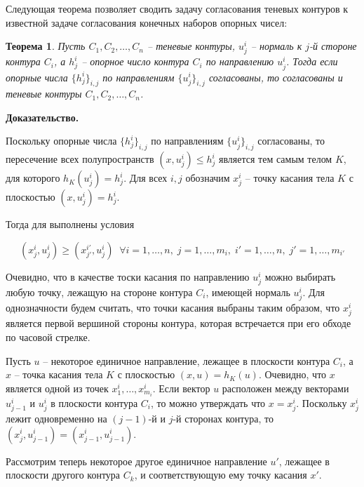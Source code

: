 \documentclass[a4paper, 10pt]{article}
\theoremstyle{definition}
\theoremstyle{plain}
\newtheorem{SmartTheorem}{Теорема}
\theoremstyle{plain}
\begin{document}
Следующая теорема позволяет сводить задачу согласования теневых контуров к
известной задаче согласования конечных наборов опорных чисел:

\begin{SmartTheorem}
 Пусть $C_{1}, C_{2}, \ldots, C_{n}$ -- теневые контуры,
 $u^{i}_{j}$ -- нормаль к $j$-й стороне контура $C_{i}$, а $h^{i}_{j}$ --
 опорное число контура $C_{i}$ по направлению $u^{i}_{j}$.
 Тогда если опорные числа $\{h^{i}_{j}\}_{i, j}$ по направлениям
 $\{u^{i}_{j}\}_{i, j}$ согласованы, то согласованы и теневые контуры
 $C_{1}, C_{2}, \ldots, C_{n}$.
\end{SmartTheorem}

\textbf{Доказательство.}

Поскольку опорные числа $\{h^{i}_{j}\}_{i, j}$ по направлениям
$\{u^{i}_{j}\}_{i, j}$ согласованы, то пересечение
всех полупространств $(x, u^{i}_{j}) \leq h^{i}_{j}$ является тем самым телом
$K$, для которого $h_{K}(u^{i}_{j}) = h^{i}_{j}$.
Для всех $i, j$ обозначим $x^{i}_{j}$ -- точку касания тела $K$ с плоскостью
$(x, u^{i}_{j}) = h^{i}_{j}$.

Тогда для выполнены условия

\begin{equation*}
 (x^{i}_{j}, u^{i}_{j}) \geq (x^{i'}_{j'}, u^{i}_{j}) \;\;
 \forall i = 1, \ldots, n, \;
 j = 1, \ldots, m_{i}, \;
 i' = 1, \ldots, n, \;
 j' = 1, \ldots, m_{i'}
\end{equation*}

Очевидно, что в качестве тоски касания по направлению $u^{i}_{j}$ можно
выбирать любую точку, лежащую на стороне контура $C_{i}$, имеющей нормаль
$u^{i}_{j}$. Для однозначности будем считать, что точки касания выбраны таким
образом, что $x^{i}_{j}$ является первой вершиной стороны контура, которая
встречается при его обходе по часовой стрелке.

Пусть $u$ -- некоторое единичное направление, лежащее в плоскости контура
$C_{i}$, а $x$ -- точка касания тела $K$ с плоскостью $(x, u) = h_{K}(u)$.
Очевидно, что $x$ является одной из точек $x^{i}_{1}, \ldots, x^{i}_{m_{i}}$.
Если вектор $u$ расположен между векторами $u^{i}_{j - 1}$ и $u^{i}_{j}$ в
плоскости контура $C_{i}$, то можно утверждать что $x = x^{i}_{j}$. Поскольку
$x^{i}_{j}$ лежит одновременно на $(j - 1)$-й и $j$-й сторонах контура, то
$(x^{i}_{j}, u^{i}_{j - 1}) = (x^{i}_{j - 1}, u^{i}_{j - 1})$.

Рассмотрим теперь некоторое другое единичное направление $u'$, лежащее в
плоскости другого контура $C_{k}$, и соответствующую ему точку касания $x'$.
\end{document}
